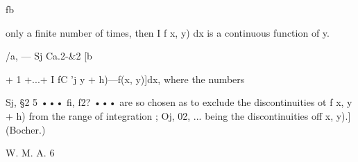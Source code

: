 fb 

only a finite number of times, then I f x, y) dx is a continuous function of y. 

/a, — Sj Ca.2-\&2 [b 

+ 1 +...+ I  fC 'j y + h)—f(x, y)]dx, where the numbers 

Sj, §2 5 ••• fi, f2? ••• are so chosen as to exclude the discontinuities ot f x, y + h) from the 
range of integration ; Oj, 02, ... being the discontinuities off x, y).] (Bocher.) 

W. M. A. 6 

